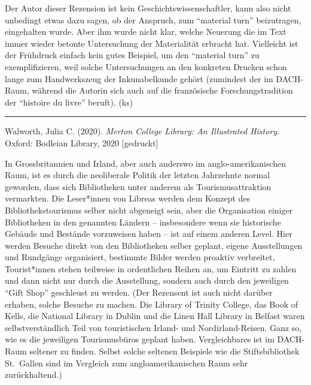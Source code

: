 \documentclass[a4paper,
fontsize=11pt,
oneside,
numbers=noperiodatend,
parskip=half-,
bibliography=totoc,
final
]{scrartcl}
\begin{document}
Der Autor dieser Rezension ist kein Geschichtswissenschaftler, kann also
nicht unbedingt etwas dazu sagen, ob der Anspruch, zum \enquote{material
turn} beizutragen, eingehalten wurde. Aber ihm wurde nicht klar, welche
Neuerung die im Text immer wieder betonte Untersuchung der Materialität
erbracht hat. Vielleicht ist der Frühdruck einfach kein gutes Beispiel,
um den \enquote{material turn} zu exemplifizieren, weil solche
Untersuchungen an den konkreten Drucken schon lange zum Handwerkszeug
der Inkunabelkunde gehört (zumindest der im DACH-Raum, während die
Autorin sich auch auf die französische Forschungstradition der
\enquote{histoire du livre} beruft). (ks)

\begin{center}\rule{0.5\linewidth}{0.5pt}\end{center}

Walworth, Julia C. (2020). \emph{Merton College Library: An Illustrated
History}. Oxford: Bodleian Library, 2020 {[}gedruckt{]}

In Grossbritannien und Irland, aber auch anderswo im
anglo-amerikanischen Raum, ist es durch die neoliberale Politik der
letzten Jahrzehnte normal geworden, dass sich Bibliotheken unter anderem
als Tourismusattraktion vermarkten. Die Leser*innen von Libreas werden
dem Konzept des Bibliothekstourismus selber nicht abgeneigt sein, aber
die Organisation einiger Bibliotheken in den genannten Ländern --
insbesondere wenn sie historische Gebäude und Bestände vorzuweisen haben
-- ist auf einem anderen Level. Hier werden Besuche direkt von den
Bibliotheken selber geplant, eigene Ausstellungen und Rundgänge
organisiert, bestimmte Bilder werden proaktiv verbreitet, Tourist*innen
stehen teilweise in ordentlichen Reihen an, um Eintritt zu zahlen und
dann nicht nur durch die Ausstellung, sondern auch durch den jeweiligen
\enquote{Gift Shop} geschleust zu werden. (Der Rezensent ist auch nicht
darüber erhaben, solche Besuche zu machen. Die Library of Trinity
College, das Book of Kells, die National Library in Dublin und die Linen
Hall Library in Belfast waren selbstverständlich Teil von touristischen
Irland- und Nordirland-Reisen. Ganz so, wie es die jeweiligen
Tourismusbüros geplant haben. Vergleichbares ist im DACH-Raum seltener
zu finden. Selbst solche seltenen Beispiele wie die Stiftsbibliothek
St.~Gallen sind im Vergleich zum angloamerikanischen Raum sehr
zurückhaltend.)
\end{document}
